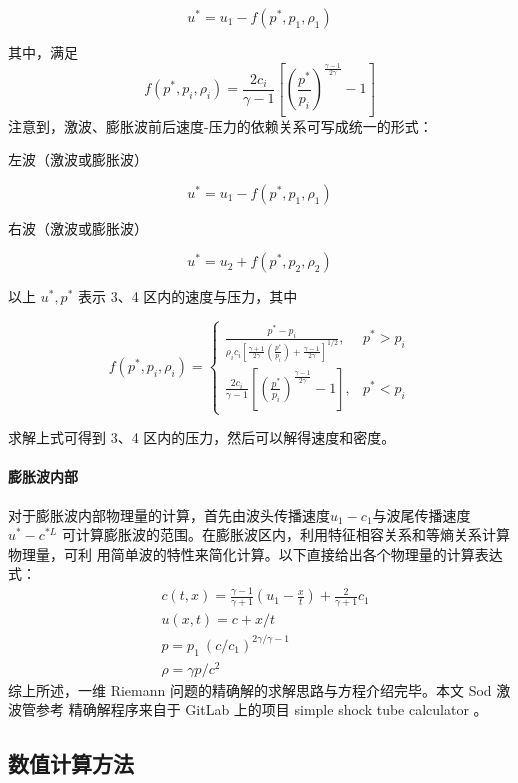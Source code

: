 \documentclass[UTF8]{ctexart}
\begin{document}
$$u^{*}=u_{1}-f(p^{*},p_{1},\rho_{1})$$

其中，满足 
\begin{equation}
f(p^{*},p_{i},\rho_{i})=\frac{2c_{i}}{\gamma-1}\left[\left(\frac{p^{*}}{p_{i}}\right)^{\frac{\gamma-1}{2\gamma}}-1\right]
\end{equation}
注意到，激波、膨胀波前后速度-压力的依赖关系可写成统一的形式：

左波（激波或膨胀波）

$$u^{*}=u_{1}-f(p^{*},p_{1},\rho_{1})$$

右波（激波或膨胀波）

$$u^{*}=u_{2}+f(p^{*},p_{2},\rho_{2})$$

以上 $u^{*},p^{*}$ 表示 3、4 区内的速度与压力，其中

\begin{equation}
f(p^{*},p_{i},\rho_{i})=\left\{\begin{array}{ll}\frac{p^{*}-p_{i}}{\rho_{i}c_{i}\left[\frac{\gamma+1}{2\gamma}\left(\frac{p^{*}}{p_{i}}\right)+\frac{\gamma-1}{2\gamma}\right]^{1/2}}, & p^{*}>p_{i}\\\frac{2c_{i}}{\gamma-1}\left[\left(\frac{p^{*}}{p_{i}}\right)^{\frac{\gamma-1}{2\gamma}}-1\right], & p^{*}<p_{i}\end{array}\right.
\end{equation}

求解上式可得到 3、4 区内的压力，然后可以解得速度和密度。
\paragraph{膨胀波内部}

对于膨胀波内部物理量的计算，首先由波头传播速度$u_1-c_1$与波尾传播速度$u^*-c^{*L}$
可计算膨胀波的范围。在膨胀波区内，利用特征相容关系和等熵关系计算物理量，可利
用简单波的特性来简化计算。以下直接给出各个物理量的计算表达式：
$$\begin{aligned}&c(t,x)=\frac{\gamma-1}{\gamma+1}\left(u_{1}-\frac{x}{t}\right)+\frac{2}{\gamma+1}c_{1}\\&u(x,t)=c+x/t\\&p=p_{1}\:(c/c_{1})^{2\gamma/\gamma-1}\\&\rho=\gamma p/c^{2}\end{aligned}$$
综上所述，一维 Riemann 问题的精确解的求解思路与方程介绍完毕。本文 Sod 激波管参考
精确解程序来自于 GitLab 上的项目 simple shock tube calculator \cite{sodcal2025}。

\subsection{数值计算方法}
\end{document}
